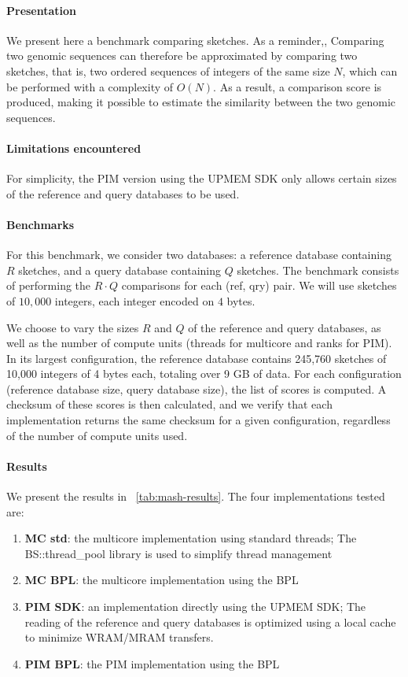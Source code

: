 \paragraph{Presentation}

We present here a benchmark comparing sketches.
As a reminder,, 
Comparing two genomic sequences can therefore be approximated by comparing two sketches, that is, two ordered sequences of integers of the same size $N$,
which can be performed with a complexity of $O(N)$. 
As a result, a comparison score is produced, making it possible to estimate the similarity between the two genomic sequences.

\paragraph{Limitations encountered} 
For simplicity, the PIM version using the UPMEM SDK only allows certain sizes of the reference and query databases to be used.

\paragraph{Benchmarks} 
For this benchmark, we consider two databases: a reference database containing $R$ sketches, and a query database containing $Q$ sketches. The benchmark consists of performing the $R \cdot Q$ comparisons for each (ref, qry) pair. 
We will use sketches of $10,000$ integers, each integer encoded on $4$ bytes.

We choose to vary the sizes $R$ and $Q$ of the reference and query databases, as well as the number of compute units (threads for multicore and ranks for PIM).
In its largest configuration, the reference database contains 245,760 sketches of 10,000 integers of 4 bytes each, totaling over 9 GB of data.
For each configuration (reference database size, query database size), the list of scores is computed. A checksum of these scores is then calculated, and we verify that each implementation returns the same checksum for a given configuration, regardless of the number of compute units used.




\paragraph{Results} We present the results in \tablename~\ref{tab:mash-results}. The four implementations tested are:
\begin{enumerate}
\item \textbf{MC std}: the multicore implementation using standard threads; The {BS::thread\_pool} library is used to simplify thread management
\item \textbf{MC BPL}: the multicore implementation using the BPL
\item \textbf{PIM SDK}: an implementation directly using the UPMEM SDK; The reading of the reference and query databases is optimized using a local cache to minimize WRAM/MRAM transfers.
\item \textbf{PIM BPL}: the PIM implementation using the BPL
\end{enumerate}

